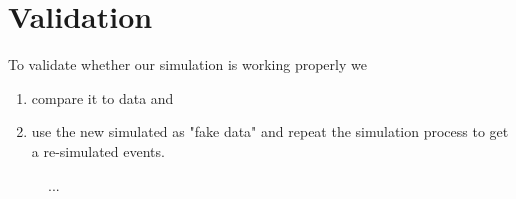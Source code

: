\documentclass[12pt]{article}
\begin{document}
\section{Validation}
To validate whether our simulation is working properly we
\begin{enumerate}
\item compare it to data and
\item use the new simulated as "fake data" and repeat the simulation process to get a re-simulated events.
\end{enumerate}

\begin{figure}[!ht]

\caption{...}
\label{figDataMCComparison_cosXcosY}
\end{figure}
\end{document}
